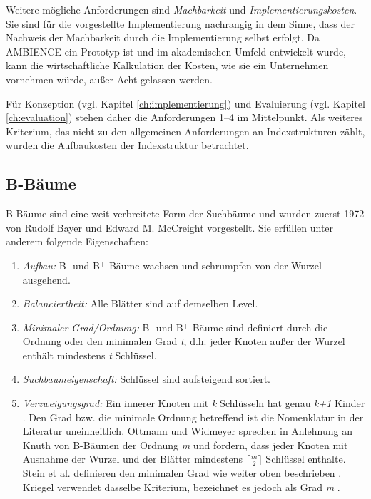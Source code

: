 Weitere mögliche Anforderungen sind \textit{Machbarkeit} und \textit{Implementierungskosten}. Sie sind für die vorgestellte Implementierung nachrangig in dem Sinne, dass der Nachweis der Machbarkeit durch die Implementierung selbst erfolgt. Da AMBIENCE ein Prototyp ist und im akademischen Umfeld entwickelt wurde, kann die wirtschaftliche Kalkulation der Kosten, wie sie ein Unternehmen vornehmen würde, außer Acht gelassen werden. 

Für Konzeption (vgl. Kapitel \ref{ch:implementierung}) und Evaluierung (vgl. Kapitel \ref{ch:evaluation}) stehen daher die Anforderungen 1--4 im Mittelpunkt. Als weiteres Kriterium, das nicht zu den allgemeinen Anforderungen an Indexstrukturen zählt, wurden die Aufbaukosten der Indexstruktur betrachtet. 
\subsection{B-Bäume}\label{sec:b-bäume}
B-Bäume sind eine weit verbreitete Form der Suchbäume und wurden zuerst 1972 von Rudolf Bayer und Edward M. McCreight vorgestellt. Sie erfüllen unter anderem folgende Eigenschaften:  
\begin{enumerate}
\setlength{\itemsep}{20pt}
	\item \textit{Aufbau:} B- und B$^+$-Bäume wachsen und schrumpfen von der Wurzel ausgehend.
	\item \textit{Balanciertheit:} Alle Blätter sind auf demselben Level. 
	\item \textit{Minimaler Grad/Ordnung:} B- und B$^+$-Bäume sind definiert durch die Ordnung oder den minimalen Grad \textit{t}, d.h. jeder Knoten außer der Wurzel enthält mindestens \textit{t} Schlüssel. 
	\item \textit{Suchbaumeigenschaft:} Schlüssel sind aufsteigend sortiert.
	\item \textit{Verzweigungsgrad:} Ein innerer Knoten mit \textit{k} Schlüsseln hat genau \textit{k+1} Kinder \cite{Ottmann2012}. Den Grad bzw. die minimale Ordnung betreffend ist die Nomenklatur in der Literatur uneinheitlich. Ottmann und Widmeyer \cite{Ottmann2012} sprechen in Anlehnung an Knuth \cite{Knuth1999} von B-Bäumen der Ordnung \textit{m} und fordern, dass jeder Knoten mit Ausnahme der Wurzel und der Blätter mindestens $\lceil\frac{m}{2}\rceil$ Schlüssel enthalte. Stein et al. definieren den minimalen Grad wie weiter oben beschrieben \cite{Stein2009}. Kriegel verwendet dasselbe Kriterium, bezeichnet es jedoch als Grad \textit{m} \cite{Kriegel1994--2013}.
\end{enumerate}	
